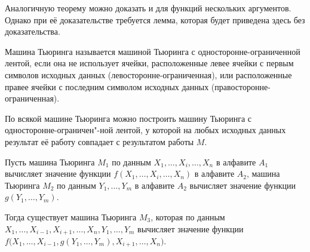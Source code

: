 Аналогичную теорему можно доказать и для функций нескольких аргументов.
Однако при её доказательстве требуется лемма, которая будет приведена здесь без доказательства.

\begin{definition}
	Машина Тьюринга называется машиной Тьюринга с односторонне-ограниченной лентой, если она не использует ячейки, расположенные левее ячейки с первым символов исходных данных (левосторонне-ограниченная), или расположенные правее ячейки с последним символом исходных данных (правосторонне-ограниченная).
\end{definition}

\begin{lemma}
	По всякой машине Тьюринга можно построить машину Тьюринга с односторонне-ограничен"-ной лентой, у которой на любых исходных данных результат её работу совпадает с результатом работы $ M $.
\end{lemma}

\begin{theorem}
	Пусть машина Тьюринга $ M_1 $ по данным $ X_1, \dots, X_i, \dots, X_n $ в алфавите $ A_1 $ вычисляет значение функции $ f(X_1, \dots, X_i, \dots, X_n) $ в алфавите $ A_2 $, машина Тьюринга $ M_2 $ по данным $ Y_1, \dots, Y_m $ в алфавите $ A_2 $ вычисляет значение функции $ g(Y_1, \dots, Y_m) $.

	Тогда существует машина Тьюринга $ M_3 $, которая по данным $ X_1, \dots, X_{i - 1}, X_{i + 1}, \dots, X_n, Y_1, \dots, Y_m $ вычисляет значение функции $ f \bigl( X_1, \dots, X_{i - 1}, g(Y_1, \dots, Y_m), X_{i + 1}, \dots, X_n \bigr) $.
\end{theorem}

